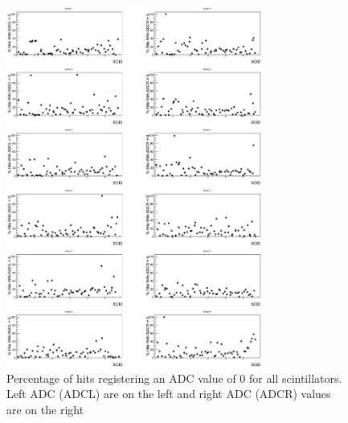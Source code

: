 



\begin{figure}\begin{center}
    \includegraphics[width=0.75\textwidth]{figures/calib/tof/tofko/adc.eps}
    \caption{\label{plt:adc0vSCID}Percentage of hits registering an ADC value of 0 for all scintillators. Left ADC (ADCL) are on the left and right ADC (ADCR) values are on the right}
\end{center}\end{figure}

